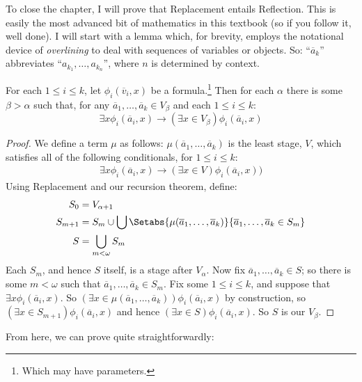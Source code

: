 \documentclass[../../../include/open-logic-section]{subfiles}
\begin{document}
To close the chapter, I will prove that Replacement entails Reflection. This is easily the most advanced bit of mathematics in this textbook (so if you follow it, well done). I will start with a lemma which, for brevity, employs the notational device of \emph{overlining} to deal with sequences of variables or objects. So: ``$\overline{a}_k$'' abbreviates ``$a_{k_1}, \ldots, a_{k_n}$'', where $n$ is determined by context. 
\begin{lem}
	For each $1 \leq i \leq k$, let $\phi_i(\overline{v}_i, x)$ be a formula.\footnote{Which may have parameters.} Then for each $\alpha$ there is some $\beta > \alpha$ such that, for any $\overline{a}_1, \ldots, \overline{a}_k \in V_\beta$ and each $1 \leq i \leq k$:
	$$\exists x\phi_i(\overline{a}_i, x) \rightarrow (\exists x \in V_\beta) \phi_i(\overline{a}_i, x)$$
\end{lem}
\begin{proof}
	We define a term $\mu$ as follows: $\mu(\overline{a}_1, \ldots, \overline{a}_k)$ is the least stage, $V$, which satisfies all of the following conditionals, for $1 \leq i \leq k$:
	\begin{align*}
		\exists x\phi_i(\overline{a}_i, x) \rightarrow (\exists x \in V) \phi_i(\overline{a}_i, x))
	\end{align*}
	Using Replacement and our recursion theorem, define:
	\begin{align*}
		S_0 &= V_{\alpha+1}\\
		S_{m+1} &= S_m \cup \bigcup\Setabs{\mu(\overline{a}_1, \ldots, \overline{a}_k)}{\overline{a}_1, \ldots, \overline{a}_k \in S_m} \\
		S &= \bigcup_{m < \omega}S_m
	\end{align*}
	Each $S_m$, and hence $S$ itself, is a stage after $V_\alpha$. Now fix $\overline{a}_1, \ldots, \overline{a}_k \in S$; so there is some $m < \omega$ such that $\overline{a}_1, \ldots, \overline{a}_k \in S_m$. Fix some $1 \leq i \leq k$, and suppose that $\exists x \phi_i(\overline{a}_i,x)$. So $(\exists x \in \mu(\overline{a}_1, \ldots, \overline{a}_k))\phi_i(\overline{a}_i, x)$ by construction, so $(\exists x \in S_{m+1})\phi_i(\overline{a}_i, x)$ and hence  $(\exists x \in S)\phi_i(\overline{a}_i, x)$. So $S$ is our $V_\beta$.
\end{proof}\noindent
From here, we can prove  quite straightforwardly:
\end{document}
